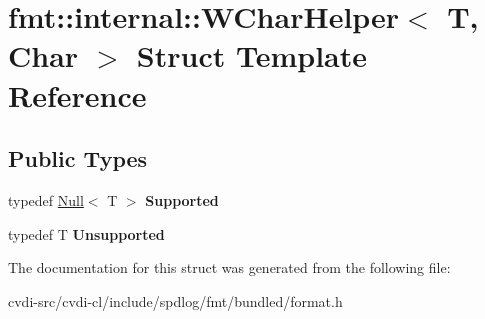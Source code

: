 \hypertarget{structfmt_1_1internal_1_1WCharHelper}{}\section{fmt\+:\+:internal\+:\+:W\+Char\+Helper$<$ T, Char $>$ Struct Template Reference}
\label{structfmt_1_1internal_1_1WCharHelper}
\subsection*{Public Types}
\begin{DoxyCompactItemize}
\item 
typedef \hyperlink{structfmt_1_1internal_1_1Null}{Null}$<$ T $>$ {\bfseries Supported}\hypertarget{structfmt_1_1internal_1_1WCharHelper_a245ff9c3b1f1c9bc2dd110c7d247abcd}{}\label{structfmt_1_1internal_1_1WCharHelper_a245ff9c3b1f1c9bc2dd110c7d247abcd}

\item 
typedef T {\bfseries Unsupported}\hypertarget{structfmt_1_1internal_1_1WCharHelper_abc10996c32464f7de811c65b94ff56a9}{}\label{structfmt_1_1internal_1_1WCharHelper_abc10996c32464f7de811c65b94ff56a9}

\end{DoxyCompactItemize}


The documentation for this struct was generated from the following file\+:\begin{DoxyCompactItemize}
\item 
cvdi-\/src/cvdi-\/cl/include/spdlog/fmt/bundled/format.\+h\end{DoxyCompactItemize}
